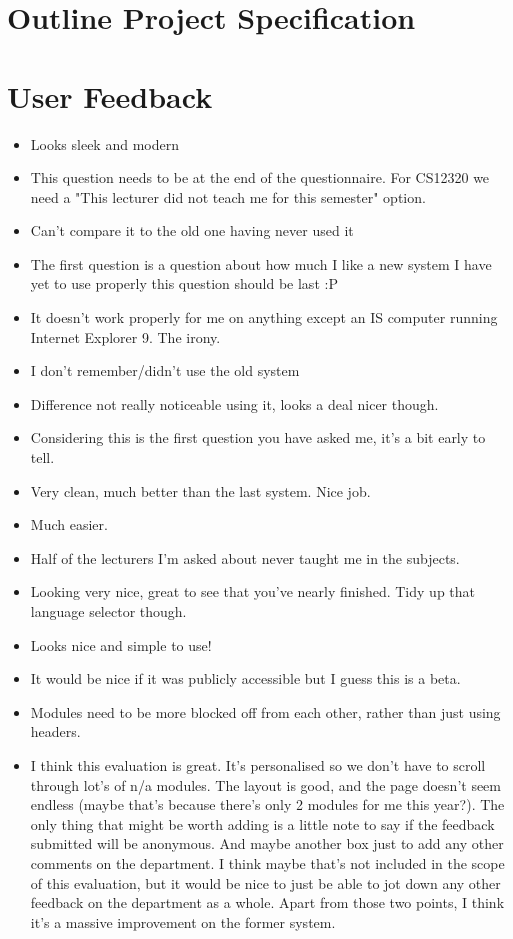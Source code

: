 \begin{appendices}

	\chapter{Outline Project Specification}
	
	
	\chapter{User Feedback}
	\label{app:userfeedback}
	
	\begin{itemize}
\item Looks sleek and modern
\item This question needs to be at the end of the questionnaire. For CS12320 we need a "This lecturer did not teach me for this semester" option.
\item Can't compare it to the old one having never used it
\item The first question is a question about how much I like a new system I have yet to use properly this question should be last :P
\item It doesn't work properly for me on anything except an IS computer running Internet Explorer 9. The irony.
\item I don't remember/didn't use the old system
\item Difference not really noticeable using it, looks a deal nicer though.
\item Considering this is the first question you have asked me, it's a bit early to tell.
\item Very clean, much better than the last system. Nice job.
\item Much easier.
\item Half of the lecturers I'm asked about never taught me in the subjects.
\item Looking very nice, great to see that you've nearly finished. Tidy up that language selector though.
\item Looks nice and simple to use!
\item It would be nice if it was publicly accessible but I guess this is a beta.
\item Modules need to be more blocked off from each other, rather than just using headers.
\item I think this evaluation is great. It's personalised so we don't have to scroll through lot's of n/a modules. The layout is good, and the page doesn't seem endless (maybe that's because there's only 2 modules for me this year?). The only thing that might be worth adding is a little note to say if the feedback submitted will be anonymous. And maybe another box just to add any other comments on the department. I think maybe that's not included in the scope of this evaluation, but it would be nice to just be able to jot down any other feedback on the department as a whole. Apart from those two points, I think it's a massive improvement on the former system.

\end{itemize}
\end{appendices}
